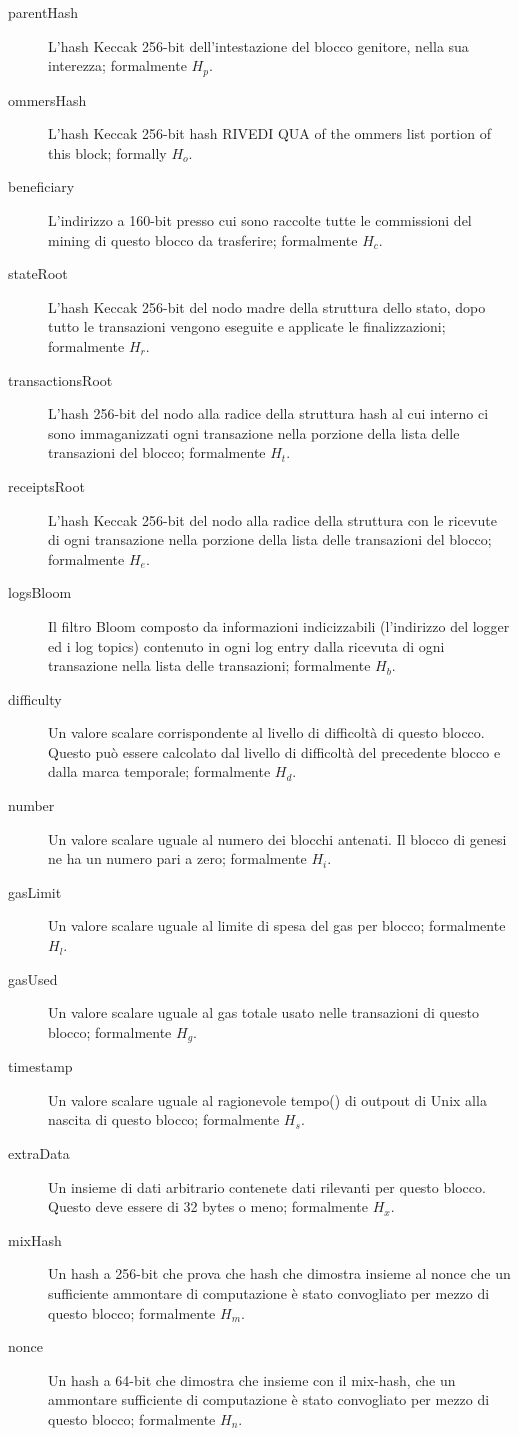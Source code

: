 \documentclass[9pt,oneside]{amsart}
\begin{document}
\begin{multicols}{2}
\begin{description}
\item[parentHash] L'hash Keccak 256-bit dell'intestazione del blocco genitore, nella sua interezza; formalmente $H_p$.
\item[ommersHash] L'hash Keccak 256-bit hash RIVEDI QUA of the ommers list portion of this block; formally $H_o$.
\item[beneficiary] L'indirizzo a 160-bit presso cui sono raccolte tutte le commissioni del mining di questo blocco da trasferire; formalmente $H_c$.
\item[stateRoot] L'hash Keccak 256-bit del nodo madre della struttura dello stato, dopo tutto le transazioni vengono eseguite e applicate le finalizzazioni; formalmente $H_r$.
\item[transactionsRoot] L'hash 256-bit del nodo alla radice della struttura hash al cui interno ci sono immaganizzati ogni transazione nella porzione della lista delle transazioni del blocco; formalmente $H_t$.
\item[receiptsRoot] L'hash Keccak 256-bit del nodo alla radice della struttura con le ricevute di ogni transazione nella porzione della lista delle transazioni del blocco; formalmente $H_e$.
\item[logsBloom] Il filtro Bloom composto da informazioni indicizzabili (l'indirizzo del logger ed i log topics) contenuto in ogni log entry dalla ricevuta di ogni transazione nella lista delle transazioni; formalmente $H_b$.
\item[difficulty] Un valore scalare corrispondente al livello di difficoltà di questo blocco. Questo può essere calcolato dal livello di difficoltà del precedente blocco e dalla marca temporale; formalmente $H_d$.
\item[number] Un valore scalare uguale al numero dei blocchi antenati. Il blocco di genesi ne ha un numero pari a zero; formalmente $H_i$.
\item[gasLimit] Un valore scalare uguale al limite di spesa del gas per blocco; formalmente $H_l$.
\item[gasUsed] Un valore scalare uguale al gas totale usato nelle transazioni di questo blocco; formalmente $H_g$.
\item[timestamp] Un valore scalare uguale al ragionevole tempo() di outpout di Unix alla nascita di questo blocco; formalmente $H_s$.
\item[extraData] Un insieme di dati arbitrario contenete dati rilevanti per questo blocco. Questo deve essere di 32 bytes o meno; formalmente $H_x$.
\item[mixHash] Un hash a 256-bit che prova che hash che dimostra insieme al nonce che un sufficiente ammontare di computazione è stato convogliato per mezzo di questo blocco; formalmente $H_m$.
\item[nonce] Un hash a 64-bit che dimostra che insieme con il mix-hash, che un ammontare sufficiente di computazione è stato convogliato per mezzo di questo blocco; formalmente $H_n$.
\end{description}


\end{multicols}
\end{document}
